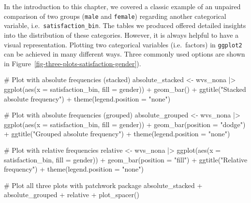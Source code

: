 \documentclass[
  letterpaper,
]{krantz}
\makeatletter
\newenvironment{Shaded}{\begin{snugshade}}{\end{snugshade}}
\newcommand{\AttributeTok}[1]{\textcolor[rgb]{0.40,0.45,0.13}{#1}}
\newcommand{\CommentTok}[1]{\textcolor[rgb]{0.37,0.37,0.37}{#1}}
\newcommand{\FunctionTok}[1]{\textcolor[rgb]{0.28,0.35,0.67}{#1}}
\newcommand{\NormalTok}[1]{\textcolor[rgb]{0.00,0.23,0.31}{#1}}
\newcommand{\OtherTok}[1]{\textcolor[rgb]{0.00,0.23,0.31}{#1}}
\newcommand{\SpecialCharTok}[1]{\textcolor[rgb]{0.37,0.37,0.37}{#1}}
\newcommand{\StringTok}[1]{\textcolor[rgb]{0.13,0.47,0.30}{#1}}
\newenvironment{kframe}{%
\medskip{}
\setlength{\fboxsep}{.8em}
 \def\at@end@of@kframe{}%
 \ifinner\ifhmode%
  \def\at@end@of@kframe{\end{minipage}}%
  \begin{minipage}{\columnwidth}%
 \fi\fi%
 \def\FrameCommand##1{\hskip\@totalleftmargin \hskip-\fboxsep
 \colorbox{shadecolor}{##1}\hskip-\fboxsep
     \hskip-\linewidth \hskip-\@totalleftmargin \hskip\columnwidth}%
 \MakeFramed {\advance\hsize-\width
   \@totalleftmargin\z@ \linewidth\hsize
   \@setminipage}}%
 {\par\unskip\endMakeFramed%
 \at@end@of@kframe}
\renewenvironment{Shaded}{\begin{kframe}}{\end{kframe}}
\makeatother
\begin{document}
In the introduction to this chapter, we covered a classic example of an
unpaired comparison of two groups (\texttt{male} and \texttt{female})
regarding another categorical variable, i.e.~\texttt{satisfaction\_bin}.
The tables we produced offered detailed insights into the distribution
of these categories. However, it is always helpful to have a visual
representation. Plotting two categorical variables (i.e.~factors) in
\texttt{ggplot2} can be achieved in many different ways. Three commonly
used options are shown in
Figure~\ref{fig-three-plots-satisfaction-gender}).

\begin{Shaded}
\begin{Highlighting}[]
\CommentTok{\# Plot with absolute frequencies (stacked)}
\NormalTok{absolute\_stacked }\OtherTok{\textless{}{-}}
\NormalTok{  wvs\_nona }\SpecialCharTok{|\textgreater{}}
  \FunctionTok{ggplot}\NormalTok{(}\FunctionTok{aes}\NormalTok{(}\AttributeTok{x =}\NormalTok{ satisfaction\_bin,}
             \AttributeTok{fill =}\NormalTok{ gender)) }\SpecialCharTok{+}
  \FunctionTok{geom\_bar}\NormalTok{() }\SpecialCharTok{+}
  \FunctionTok{ggtitle}\NormalTok{(}\StringTok{"Stacked absolute frequency"}\NormalTok{) }\SpecialCharTok{+}
  \FunctionTok{theme}\NormalTok{(}\AttributeTok{legend.position =} \StringTok{"none"}\NormalTok{)}

\CommentTok{\# Plot with absolute frequencies (grouped)}
\NormalTok{absolute\_grouped }\OtherTok{\textless{}{-}}
\NormalTok{  wvs\_nona }\SpecialCharTok{|\textgreater{}}
  \FunctionTok{ggplot}\NormalTok{(}\FunctionTok{aes}\NormalTok{(}\AttributeTok{x =}\NormalTok{ satisfaction\_bin,}
             \AttributeTok{fill =}\NormalTok{ gender)) }\SpecialCharTok{+}
  \FunctionTok{geom\_bar}\NormalTok{(}\AttributeTok{position =} \StringTok{"dodge"}\NormalTok{) }\SpecialCharTok{+}
  \FunctionTok{ggtitle}\NormalTok{(}\StringTok{"Grouped absolute frequency"}\NormalTok{) }\SpecialCharTok{+}
  \FunctionTok{theme}\NormalTok{(}\AttributeTok{legend.position =} \StringTok{"none"}\NormalTok{)}

\CommentTok{\# Plot with relative frequencies}
\NormalTok{relative }\OtherTok{\textless{}{-}}
\NormalTok{  wvs\_nona }\SpecialCharTok{|\textgreater{}}
  \FunctionTok{ggplot}\NormalTok{(}\FunctionTok{aes}\NormalTok{(}\AttributeTok{x =}\NormalTok{ satisfaction\_bin,}
             \AttributeTok{fill =}\NormalTok{ gender)) }\SpecialCharTok{+}
  \FunctionTok{geom\_bar}\NormalTok{(}\AttributeTok{position =} \StringTok{"fill"}\NormalTok{) }\SpecialCharTok{+}
  \FunctionTok{ggtitle}\NormalTok{(}\StringTok{"Relative frequency"}\NormalTok{) }\SpecialCharTok{+}
  \FunctionTok{theme}\NormalTok{(}\AttributeTok{legend.position =} \StringTok{"none"}\NormalTok{)}

\CommentTok{\# Plot all three plots with \textquotesingle{}patchwork\textquotesingle{} package}
\NormalTok{absolute\_stacked }\SpecialCharTok{+}\NormalTok{ absolute\_grouped }\SpecialCharTok{+}\NormalTok{ relative }\SpecialCharTok{+} \FunctionTok{plot\_spacer}\NormalTok{()}
\end{Highlighting}
\end{Shaded}
\end{document}

